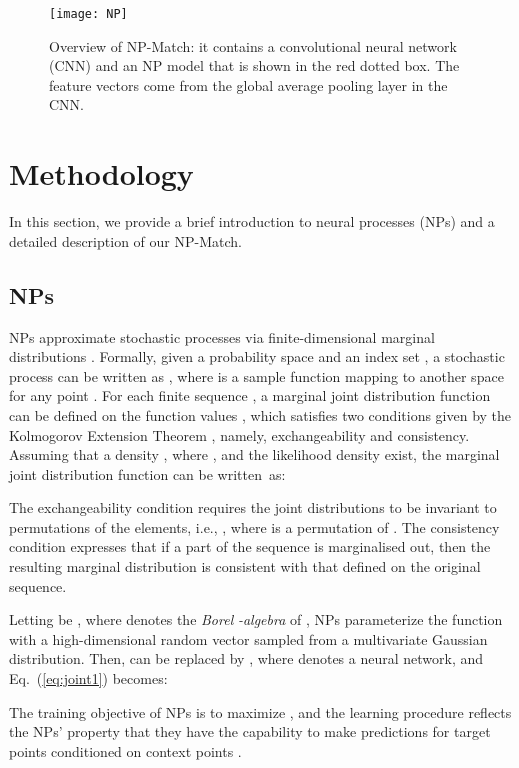 \documentclass[nohyperref]{article}
\theoremstyle{plain}
\theoremstyle{definition}
\theoremstyle{remark}
\begin{document}
\begin{figure*}[t]
\centering
\texttt{[image: NP]}
\vspace{-1ex}
\caption{
Overview of NP-Match: it contains a convolutional neural network (CNN) and an NP model that is shown in the red dotted box. The feature vectors come from the global average pooling layer in the CNN.}
\label{fig:np} 
\end{figure*}


\section{Methodology}
\label{sec:methodology}  
In this section, we provide a brief introduction to neural processes (NPs) and a detailed description of our NP-Match.  

\subsection{NPs}

NPs approximate stochastic processes via finite-dimensional marginal distributions \cite{garnelo2018neural}. Formally, given a probability space  and an index set , a stochastic process can be  written as , where  is a sample function
mapping   to another space  for any point . For each finite sequence , a marginal joint distribution function can be defined on the function values , which satisfies two conditions given by the Kolmogorov Extension Theorem \cite{oksendal2003stochastic}, namely, exchangeability and consistency. 
Assuming that a density , where , and the likelihood density  exist, the marginal joint distribution function can be written~as:

The exchangeability condition requires the joint distributions to be invariant to permutations of the elements, i.e., , where  is a permutation of . 
The consistency condition expresses  that if a part of the sequence is marginalised out, then the resulting marginal distribution is consistent with that defined on the original sequence. 

Letting  be ,  where  denotes the {\it Borel} {\it -algebra} of , NPs parameterize the function  with a high-dimensional random vector  sampled from a multivariate Gaussian distribution. Then,  can be replaced by , where  denotes a neural network, and Eq.~(\ref{eq:joint1}) becomes:
 
The training objective of NPs is to maximize , and the learning procedure reflects the NPs' property that they have the capability to make predictions for target points conditioned on context points \cite{garnelo2018neural}. 
\end{document}
